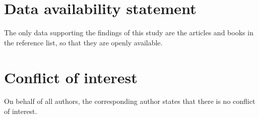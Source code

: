 \documentclass{amsart} %
\numberwithin{equation}{section}
\theoremstyle{definition}
\begin{document}
\section*{Data availability statement}

 The only data supporting the findings of this study are the articles and books in the reference list, so that they are openly available.

\section*{Conflict of interest}
On behalf of all authors, the corresponding author states that there is no conflict of interest.

\end{document}
